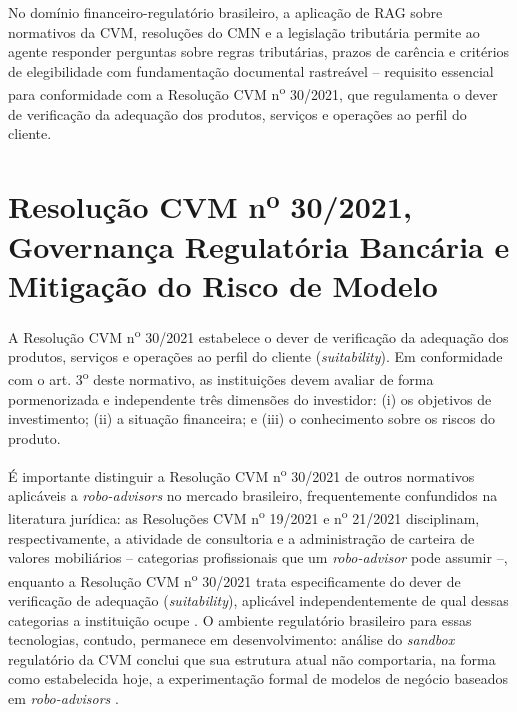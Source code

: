 No dom\'inio financeiro-regulat\'orio brasileiro, a aplica\c{c}\~ao de RAG
sobre normativos da CVM, resolu\c{c}\~oes do CMN e a legisla\c{c}\~ao tribut\'aria
permite ao agente responder perguntas sobre regras tribut\'arias, prazos
de car\^encia e crit\'erios de elegibilidade com fundamenta\c{c}\~ao
documental rastre\'avel -- requisito essencial para conformidade com a
Resolu\c{c}\~ao CVM n\textsuperscript{o} 30/2021, que regulamenta o dever
de verifica\c{c}\~ao da adequa\c{c}\~ao dos produtos, servi\c{c}os e
opera\c{c}\~oes ao perfil do cliente.

\section{Resolu\c{c}\~ao CVM n\textsuperscript{o} 30/2021, Governan\c{c}a Regulat\'oria Banc\'aria e Mitiga\c{c}\~ao do Risco de Modelo}
\label{sec:cvm30}

A Resolu\c{c}\~ao CVM n\textsuperscript{o} 30/2021 \autocite{resolucaocvm30} estabelece o dever de
verifica\c{c}\~ao da adequa\c{c}\~ao dos produtos, servi\c{c}os e
opera\c{c}\~oes ao perfil do cliente (\textit{suitability}). Em
conformidade com o art. 3\textsuperscript{o} deste normativo, as
institui\c{c}\~oes devem avaliar de forma pormenorizada e independente
tr\^es dimens\~oes do investidor: (i) os objetivos de investimento; (ii) a
situa\c{c}\~ao financeira; e (iii) o conhecimento sobre os riscos do
produto.

\'E importante distinguir a Resolu\c{c}\~ao CVM n\textsuperscript{o}
30/2021 de outros normativos aplic\'aveis a \textit{robo-advisors} no
mercado brasileiro, frequentemente confundidos na literatura jur\'idica:
as Resolu\c{c}\~oes CVM n\textsuperscript{o} 19/2021 e n\textsuperscript{o}
21/2021 disciplinam, respectivamente, a atividade de consultoria e a
administra\c{c}\~ao de carteira de valores mobili\'arios -- categorias
profissionais que um \textit{robo-advisor} pode assumir --, enquanto a
Resolu\c{c}\~ao CVM n\textsuperscript{o} 30/2021 trata especificamente do
dever de verifica\c{c}\~ao de adequa\c{c}\~ao (\textit{suitability}),
aplic\'avel independentemente de qual dessas categorias a institui\c{c}\~ao
ocupe \autocite{pagan2023}. O ambiente regulat\'orio brasileiro para
essas tecnologias, contudo, permanece em desenvolvimento: an\'alise do
\textit{sandbox} regulat\'orio da CVM conclui que sua estrutura atual
n\~ao comportaria, na forma como estabelecida hoje, a experimenta\c{c}\~ao
formal de modelos de neg\'ocio baseados em \textit{robo-advisors}
\autocite{muniz2025}.

